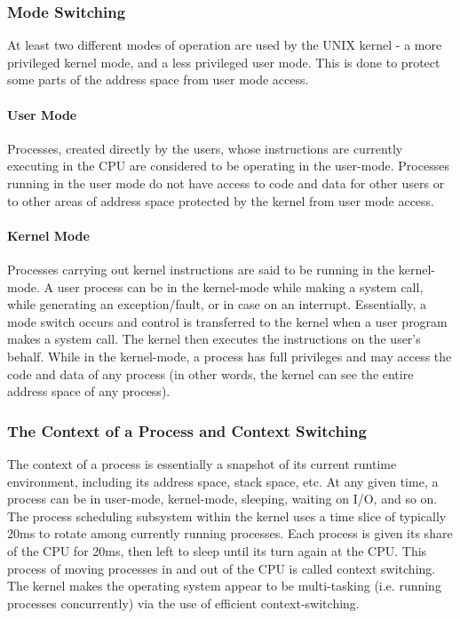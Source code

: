 \documentclass{article}
\begin{document}
\subsubsection{Mode Switching}
At least two different modes of operation are used by the UNIX kernel - a more
privileged kernel mode, and a less privileged user mode. This is done to protect some
parts of the address space from user mode access.
\paragraph{User Mode}Processes, created directly by the users, whose instructions are currently executing in the CPU are considered to be operating in the user-mode. Processes
running in the user mode do not have access to code and data for other users or to
other areas of address space protected by the kernel from user mode access.
\paragraph{Kernel Mode}Processes carrying out kernel instructions are said to be running in the kernel-mode. A user process can be in the kernel-mode while making a system call,
while generating an exception/fault, or in case on an interrupt. Essentially, a mode
switch occurs and control is transferred to the kernel when a user program makes a
system call. The kernel then executes the instructions on the user's behalf.
While in the kernel-mode, a process has full privileges and may access the code and
data of any process (in other words, the kernel can see the entire address space of any
process).

\subsubsection{The Context of a Process and Context Switching}
The context of a process is essentially a snapshot of its current runtime environment,
including its address space, stack space, etc. At any given time, a process can be in
user-mode, kernel-mode, sleeping, waiting on I/O, and so on. The process scheduling
subsystem within the kernel uses a time slice of typically 20ms to rotate among
currently running processes. Each process is given its share of the CPU for 20ms, then
left to sleep until its turn again at the CPU. This process of moving processes in and
out of the CPU is called context switching. The kernel makes the operating system
appear to be multi-tasking (i.e. running processes concurrently) via the use of efficient
context-switching.
\end{document}
